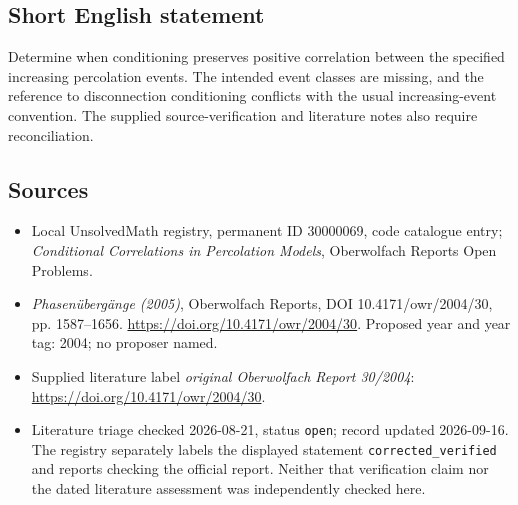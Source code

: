 \documentclass[11pt]{article}
\begin{document}
\subsection{Short English statement}
Determine when conditioning preserves positive correlation between the specified increasing percolation events. The intended event classes are missing, and the reference to disconnection conditioning conflicts with the usual increasing-event convention. The supplied source-verification and literature notes also require reconciliation.
\subsection{Sources}
\begin{itemize}\item Local UnsolvedMath registry, permanent ID 30000069, code catalogue entry; \emph{Conditional Correlations in Percolation Models}, Oberwolfach Reports Open Problems.\item \emph{Phasen\"uberg\"ange (2005)}, Oberwolfach Reports, DOI 10.4171/owr/2004/30, pp. 1587--1656. \url{https://doi.org/10.4171/owr/2004/30}. Proposed year and year tag: 2004; no proposer named.\item Supplied literature label \emph{original Oberwolfach Report 30/2004}: \url{https://doi.org/10.4171/owr/2004/30}.\item Literature triage checked 2026-08-21, status \texttt{open}; record updated 2026-09-16. The registry separately labels the displayed statement \texttt{corrected\_verified} and reports checking the official report. Neither that verification claim nor the dated literature assessment was independently checked here.\end{itemize}
\end{document}
